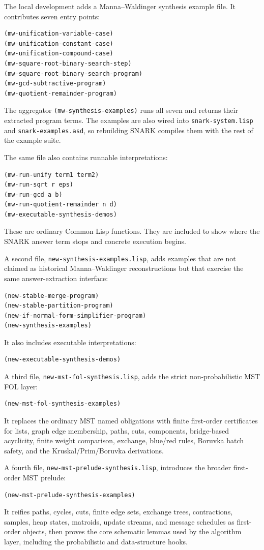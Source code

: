 \documentclass[runningheads]{llncs}
\begin{document}
The local development adds a Manna--Waldinger synthesis example file.  It
contributes seven entry points:
\begin{lstlisting}
(mw-unification-variable-case)
(mw-unification-constant-case)
(mw-unification-compound-case)
(mw-square-root-binary-search-step)
(mw-square-root-binary-search-program)
(mw-gcd-subtractive-program)
(mw-quotient-remainder-program)
\end{lstlisting}
The aggregator \texttt{(mw-synthesis-examples)} runs all seven and returns their
extracted program terms.  The examples are also wired into
\texttt{snark-system.lisp} and \texttt{snark-examples.asd}, so rebuilding SNARK
compiles them with the rest of the example suite.

The same file also contains runnable interpretations:
\begin{lstlisting}
(mw-run-unify term1 term2)
(mw-run-sqrt r eps)
(mw-run-gcd a b)
(mw-run-quotient-remainder n d)
(mw-executable-synthesis-demos)
\end{lstlisting}
These are ordinary Common Lisp functions.  They are included to show where the
SNARK answer term stops and concrete execution begins.

A second file, \texttt{new-synthesis-examples.lisp}, adds examples that are not
claimed as historical Manna--Waldinger reconstructions but that exercise the
same answer-extraction interface:
\begin{lstlisting}
(new-stable-merge-program)
(new-stable-partition-program)
(new-if-normal-form-simplifier-program)
(new-synthesis-examples)
\end{lstlisting}
It also includes executable interpretations:
\begin{lstlisting}
(new-executable-synthesis-demos)
\end{lstlisting}

A third file, \texttt{new-mst-fol-synthesis.lisp}, adds the strict
non-probabilistic MST FOL layer:
\begin{lstlisting}
(new-mst-fol-synthesis-examples)
\end{lstlisting}
It replaces the ordinary MST named obligations with finite first-order
certificates for lists, graph edge membership, paths, cuts, components,
bridge-based acyclicity, finite weight comparison, exchange, blue/red rules,
Boruvka batch safety, and the Kruskal/Prim/Boruvka derivations.

A fourth file, \texttt{new-mst-prelude-synthesis.lisp}, introduces the broader
first-order MST prelude:
\begin{lstlisting}
(new-mst-prelude-synthesis-examples)
\end{lstlisting}
It reifies paths, cycles, cuts, finite edge sets, exchange trees,
contractions, samples, heap states, matroids, update streams, and message
schedules as first-order objects, then proves the core schematic lemmas used
by the algorithm layer, including the probabilistic and data-structure hooks.
\end{document}
